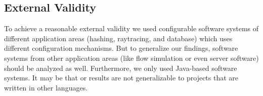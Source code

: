 \subsection{External Validity}

To achieve a reasonable external validity we used configurable software systems of different application areas (hashing, raytracing, and database) which uses different configuration mechanisms. But to generalize our findings, software systems from other application areas (like flow simulation or even server software) should be analyzed as well. Furthermore, we only used Java-based software systems. It may be that or results are not generalizable to projects that are written in other languages. 
